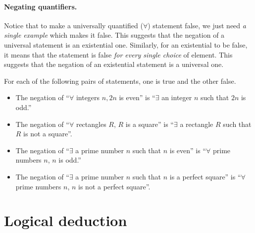 \documentclass{tufte-book}
\begin{document}
\paragraph{Negating quantifiers.}
\label{sec:negat-quant}

Notice that to make a universally quantified ($\forall$) statement false, we just need \emph{a single example} which makes it false. This suggests that the negation of a universal statement is an existential one. Similarly, for an existential to be false, it means that the statement is false \emph{for every single choice} of element. This suggests that the negation of an existential statement is a universal one.
\begin{example}
  For each of the following pairs of statements, one is true and the other false.
\begin{itemize}
    \item The negation of ``$\forall$ integers $n, 2n$ is even'' is ``$\exists$
  an integer $n$ such that $2n$ is odd.''
    \item The negation of ``$\forall$ rectangles $R$, $R$ is a square'' is
  ``$\exists$ a rectangle $R$ such that $R$ is not a square''.
    \item The negation of ``$\exists$ a prime number $n$ such that $n$ is
  even'' is ``$\forall$ prime numbers $n$, $n$ is odd.''
    \item The negation of ``$\exists$ a prime number $n$ such that $n$ is
  a perfect square'' is ``$\forall$ prime numbers $n$, $n$ is not a
  perfect square''.
\end{itemize}
\end{example}



\section{Logical deduction}
\label{sec:logical-deduction}
\end{document}

